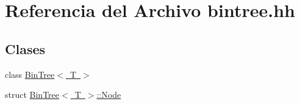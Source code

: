 \hypertarget{bintree_8hh}{}\section{Referencia del Archivo bintree.\+hh}
\label{bintree_8hh}
\subsection*{Clases}
\begin{DoxyCompactItemize}
\item 
class \mbox{\hyperlink{class_bin_tree}{Bin\+Tree$<$ T $>$}}
\item 
struct \mbox{\hyperlink{struct_bin_tree_1_1_node}{Bin\+Tree$<$ T $>$\+::\+Node}}
\end{DoxyCompactItemize}
